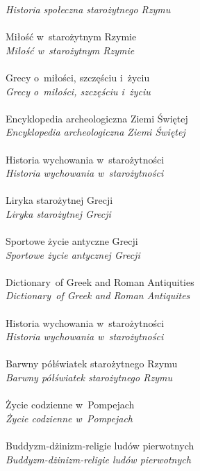 \documentclass[a4paper,11pt]{article}
\begin{document}
\Powin \textit{Historia społeczna starożytnego Rzymu} \\
 \\
\Jest  Miłość w~starożytnym Rzymie \\
\Powin \textit{Miłość w~starożytnym Rzymie} \\
 \\
\Jest  Grecy o~miłości, szczęściu i~życiu \\
\Powin \textit{Grecy o~miłości, szczęściu i~życiu} \\
 \\
\Jest  Encyklopedia archeologiczna Ziemi Świętej \\
\Powin \textit{Encyklopedia archeologiczna Ziemi Świętej} \\
 \\
\Jest  Historia wychowania w~starożytności \\
\Powin \textit{Historia wychowania w~starożytności} \\
 \\
\Jest  Liryka starożytnej Grecji \\
\Powin \textit{Liryka starożytnej Grecji} \\
 \\
\Jest  Sportowe życie antyczne Grecji \\
\Powin \textit{Sportowe życie antycznej Grecji} \\
 \\
\Jest  Dictionary~of Greek and Roman Antiquities \\
\Powin \textit{Dictionary~of Greek and Roman Antiquites} \\
 \\
\Jest  Historia wychowania w~starożytności \\
\Powin \textit{Historia wychowania w~starożytności} \\
 \\
\Jest  Barwny półświatek starożytnego Rzymu \\
\Powin \textit{Barwny półświatek starożytnego Rzymu} \\
 \\
\Jest  Życie codzienne w~Pompejach \\
\Powin \textit{Życie codzienne w~Pompejach} \\
 \\
\Jest  Buddyzm-dżinizm-religie ludów pierwotnych \\
\Powin \textit{Buddyzm-dżinizm-religie ludów pierwotnych} \\
\end{document}
